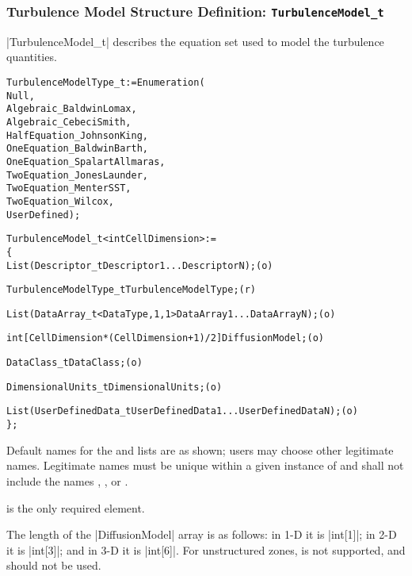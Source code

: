 \subsubsection{Turbulence Model Structure Definition: \texttt{TurbulenceModel\_t}}

|TurbulenceModel_t| describes the equation set used to model the
turbulence quantities.
\begin{alltt}
  TurbulenceModelType\_t := Enumeration(
    Null,
    Algebraic\_BaldwinLomax,
    Algebraic\_CebeciSmith,
    HalfEquation\_JohnsonKing,
    OneEquation\_BaldwinBarth,
    OneEquation\_SpalartAllmaras,
    TwoEquation\_JonesLaunder,
    TwoEquation\_MenterSST,
    TwoEquation\_Wilcox,
    UserDefined ) ;

  TurbulenceModel\_t< int CellDimension > :=
    \{
    List( Descriptor\_t Descriptor1 ... DescriptorN ) ;                      (o)

    TurbulenceModelType\_t TurbulenceModelType ;                             (r)
    
    List( DataArray\_t<DataType, 1, 1> DataArray1 ... DataArrayN ) ;         (o)

    int[CellDimension*(CellDimension + 1)/2] DiffusionModel ;               (o)

    DataClass\_t DataClass ;                                                 (o)
                
    DimensionalUnits\_t DimensionalUnits ;                                   (o)

    List( UserDefinedData\_t UserDefinedData1 ... UserDefinedDataN ) ;       (o)
    \} ;
\end{alltt}

\begin{notes}
\item
 Default names for the  and 
 lists are as shown; users may choose other legitimate names.
 Legitimate names must be unique within a given instance of
  and shall not include the names
 , , or .
\item
  is the only required element.
\item
 The length of the |DiffusionModel| array is as follows: in 1-D it is
 |int[1]|; in 2-D it is |int[3]|; and in 3-D it is |int[6]|.
 For unstructured zones,  is not supported, and
 should not be used.
\end{notes}

